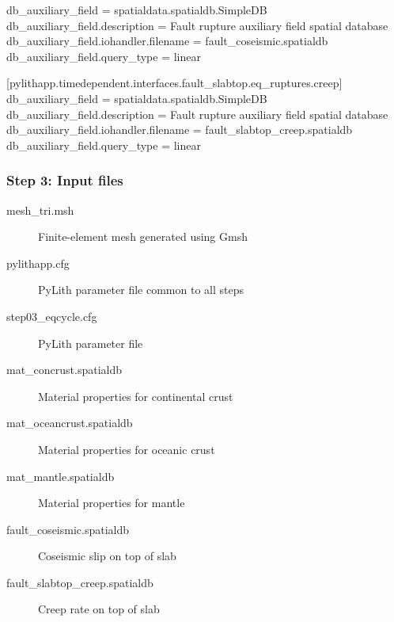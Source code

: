 \documentclass[aspectratio=169]{beamer}
\begin{document}
\begin{frame}[t,fragile]
\begin{minipage}[t]{0.67\textwidth}
\begin{onlyenv}
\begin{cfgcode}
        db_auxiliary_field = spatialdata.spatialdb.SimpleDB
        db_auxiliary_field.description = Fault rupture auxiliary field spatial database
        db_auxiliary_field.iohandler.filename = fault_coseismic.spatialdb
        db_auxiliary_field.query_type = linear

        [pylithapp.timedependent.interfaces.fault_slabtop.eq_ruptures.creep]
        db_auxiliary_field = spatialdata.spatialdb.SimpleDB
        db_auxiliary_field.description = Fault rupture auxiliary field spatial database
        db_auxiliary_field.iohandler.filename = fault_slabtop_creep.spatialdb
        db_auxiliary_field.query_type = linear
      \end{cfgcode}
    \end{onlyenv}
  \end{minipage}

  
\end{frame}


\begin{frame}
  \frametitle{Step 3: Input files}
  \summary{}

  \begin{description}
  \item[mesh\_tri.msh] Finite-element mesh generated using Gmsh
  \item[pylithapp.cfg] PyLith parameter file common to all steps
  \item[step03\_eqcycle.cfg] PyLith parameter file
  \item[mat\_concrust.spatialdb] Material properties for continental crust
  \item[mat\_oceancrust.spatialdb] Material properties for oceanic crust
  \item[mat\_mantle.spatialdb] Material properties for mantle
  \item[fault\_coseismic.spatialdb] Coseismic slip on top of slab
  \item[fault\_slabtop\_creep.spatialdb] Creep rate on top of slab
  \end{description}
    
\end{frame}
\end{document}
